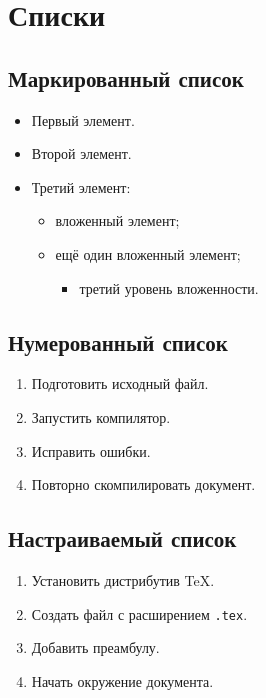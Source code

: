\documentclass[12pt,a4paper]{article}
\theoremstyle{definition}
\theoremstyle{remark}
\begin{document}
\section{Списки}

\subsection{Маркированный список}

\begin{itemize}
    \item Первый элемент.
    \item Второй элемент.
    \item Третий элемент:
    \begin{itemize}
        \item вложенный элемент;
        \item ещё один вложенный элемент;
        \begin{itemize}
            \item третий уровень вложенности.
        \end{itemize}
    \end{itemize}
\end{itemize}

\subsection{Нумерованный список}

\begin{enumerate}
    \item Подготовить исходный файл.
    \item Запустить компилятор.
    \item Исправить ошибки.
    \item Повторно скомпилировать документ.
\end{enumerate}

\subsection{Настраиваемый список}

\begin{enumerate}[label=\textbf{Шаг \arabic*:}, leftmargin=25mm]
    \item Установить дистрибутив TeX.
    \item Создать файл с расширением \texttt{.tex}.
    \item Добавить преамбулу.
    \item Начать окружение документа.
\end{enumerate}
\end{document}

